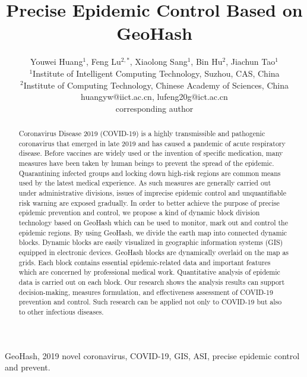 \documentclass[conference]{IEEEtran}
\begin{document}
\title{Precise Epidemic Control Based on GeoHash}

\author{
    Youwei Huang$^{1}$, Feng Lu$^{2,*}$, Xiaolong Sang$^{1}$, Bin Hu$^{2}$, Jiachun Tao$^{1}$
    \\
    \normalsize $^{1}$Institute of Intelligent Computing Technology, Suzhou, CAS, China
    \\
    \normalsize $^{2}$Institute of Computing Technology, Chinese Academy of Sciences, China
    \\
    \normalsize huangyw@iict.ac.cn, lufeng20g@ict.ac.cn
    \\
    \normalsize *corresponding author
}

\maketitle

\begin{abstract}
    Coronavirus Disease 2019 (COVID-19) is a highly transmissible and pathogenic coronavirus that emerged in late 2019 and has caused a pandemic of acute respiratory disease.
    Before vaccines are widely used or the invention of specific medication, many measures have been taken by human beings to prevent the spread of the epidemic.
    Quarantining infected groups and locking down high-risk regions are common means used by the latest medical experience.
    As such measures are generally carried out under administrative divisions, issues of imprecise epidemic control and unquantifiable risk warning are exposed gradually.
    In order to better achieve the purpose of precise epidemic prevention and control, we propose a kind of dynamic block division technology based on GeoHash which can be used to monitor, mark out and control the epidemic regions.
    By using GeoHash, we divide the earth map into connected dynamic blocks.
    Dynamic blocks are easily visualized in geographic information systems (GIS) equipped in electronic devices.
    GeoHash blocks are dynamically overlaid on the map as grids.
    Each block contains essential epidemic-related data and important features which are concerned by professional medical work.
    Quantitative analysis of epidemic data is carried out on each block.
    Our research shows the analysis results can support decision-making, measures formulation, and effectiveness assessment of COVID-19 prevention and control.
    Such research can be applied not only to COVID-19 but also to other infectious diseases.
\end{abstract}
\IEEEoverridecommandlockouts
\begin{keywords}
    GeoHash, 2019 novel coronavirus, COVID-19, GIS, ASI, precise epidemic control and prevent.
\end{keywords}
\end{document}
